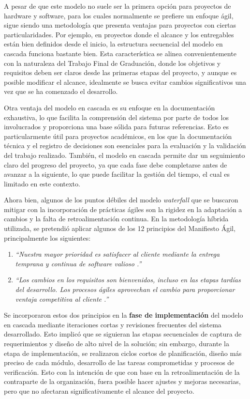 A pesar de que este modelo no suele ser la primera opción para proyectos de hardware y software, para los cuales normalmente se prefiere un enfoque ágil, sigue siendo una metodología que presenta ventajas para proyectos con ciertas particularidades. Por ejemplo, en proyectos donde el alcance y los entregables están bien definidos desde el inicio, la estructura secuencial del modelo en cascada funciona bastante bien. Esta característica se alinea convenientemente con la naturaleza del Trabajo Final de Graduación, donde los objetivos y requisitos deben ser claros desde las primeras etapas del proyecto, y aunque es posible modificar el alcance, idealmente se busca evitar cambios significativos una vez que se ha comenzado el desarrollo.

Otra ventaja del modelo en cascada es su enfoque en la documentación exhaustiva, lo que facilita la comprensión del sistema por parte de todos los involucrados y proporciona una base sólida para futuras referencias. Esto es particularmente útil para proyectos académicos, en los que la documentación técnica y el registro de decisiones son esenciales para la evaluación y la validación del trabajo realizado. También, el modelo en cascada permite dar un seguimiento claro del progreso del proyecto, ya que cada fase debe completarse antes de avanzar a la siguiente, lo que puede facilitar la gestión del tiempo, el cual es limitado en este contexto. 

Ahora bien, algunos de los puntos débiles del modelo \textit{waterfall} que se buscaron mitigar con la incorporación de prácticas ágiles son la rigidez en la adaptación a cambios y la falta de retroalimentación continua. En la metodología híbrida utilizada, se pretendió aplicar algunos de los 12 principios del Manifiesto Ágil, principalmente los siguientes:

\begin{enumerate}
    \item \textit{``Nuestra mayor prioridad es satisfacer al cliente mediante la entrega temprana y continua de software valioso \cite{agile_principles}.''} 
    \item \textit{``Los cambios en los requisitos son bienvenidos, incluso en las etapas tardías del desarrollo. Los procesos ágiles aprovechan el cambio para proporcionar ventaja competitiva al cliente \cite{agile_principles}.''}
\end{enumerate}

Se incorporaron estos dos principios en la \textbf{fase de implementación} del modelo en cascada mediante iteraciones cortas y revisiones frecuentes del sistema desarrollado. Esto implicó que se siguieran las etapas secuenciales de captura de requerimientos y diseño de alto nivel de la solución; sin embargo, durante la etapa de implementación, se realizaron ciclos cortos de planificación, diseño más preciso de cada módulo, desarrollo de las tareas comprometidas y procesos de verificación. Esto con la intención de que con base en la retroalimentación de la contraparte de la organización, fuera posible hacer ajustes y mejoras necesarias, pero que no afectaran significativamente el alcance del proyecto. 

